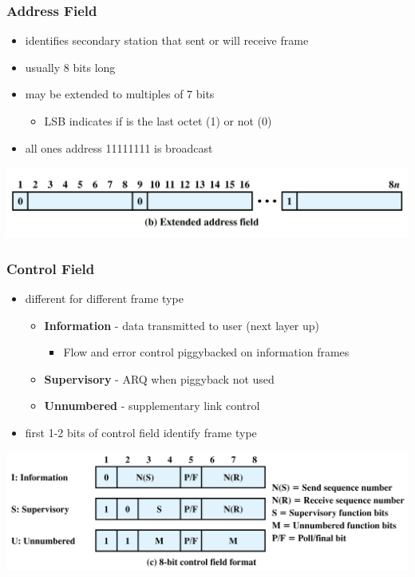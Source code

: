 \documentclass[pdflatex,compress]{beamer}
\begin{document}
\begin{frame}
	\frametitle{Address Field}
	\begin{itemize}
		\item identifies secondary station that sent or will receive frame
		\item usually 8 bits long
		\item may be extended to multiples of 7 bits
		\begin{itemize}
			\item LSB indicates if is the last octet (1) or not (0)
		\end{itemize}
		\item all ones address 11111111 is broadcast
	\end{itemize}
	\begin{center}
		\includegraphics[width=\textwidth]{img/img10}
	\end{center}
\end{frame}

\begin{frame}
	\frametitle{Control Field}
	\begin{itemize}
		\item different for different frame type
		\begin{itemize}
			\item \textbf{Information} - data transmitted to user (next layer up)
			\begin{itemize}
				\item Flow and error control piggybacked on information frames
			\end{itemize}
			\item \textbf{Supervisory} - ARQ when piggyback not used
			\item \textbf{Unnumbered} - supplementary link control
		\end{itemize}
		\item first 1-2 bits of control field identify frame type
	\end{itemize}
	\begin{center}
		\includegraphics[width=\textwidth]{img/img11}
	\end{center}
\end{frame}
\end{document}
